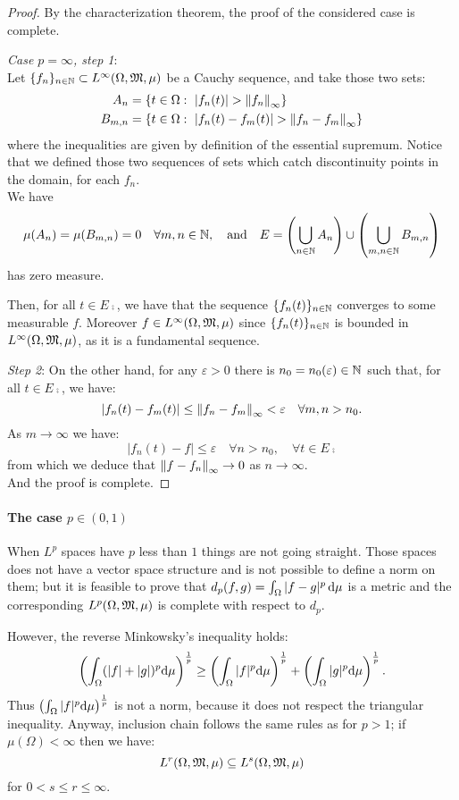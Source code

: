\begin{proof}
	By the characterization theorem, the proof of the considered case is complete.
	
	\textit{Case $p = \infty$, step 1}:\\
	Let $\{f_n\}_{n\in\mathbb N}\subset L^\infty(\Omega,\mathfrak M,\mu)$ be a Cauchy sequence, and take those two sets:
	\begin{align*}
		A_n 
		&= \{
			t\in \Omega : 
			\ |f_n(t)|>\norm{f_n}_\infty
		\} \\
		B_{m,n} 
		&= \{
			t\in \Omega : 
			\ |f_n(t)-f_m(t)|>\norm{f_n-f_m}_\infty
		\}
	\end{align*}
	where the inequalities are given by definition of the essential supremum. Notice that we defined those two sequences of sets which catch discontinuity points in the domain, for each $f_n$.\\
	We have
	$$
		\mu(A_n) 
		= \mu(B_{m,n})
		= 0
		\quad \forall m,n 
		\in \mathbb N
	, 
		\quad \text{and}
		\quad E 
		= \left(\bigcup_{n \in \mathbb N} A_n \right)
		\cup \left(\bigcup_{m,n\in \mathbb N}B_{m,n}\right)
	$$
	has zero measure.
	
	Then, for all $t \in E\comp$, we have that the sequence $\{f_n(t)\}_{n\in\mathbb N}$ converges to some measurable $f$. Moreover $f \in L^\infty(\Omega,\mathfrak M,\mu)$ since $\{f_n(t)\}_{n\in\mathbb N}$ is bounded in $L^\infty(\Omega,\mathfrak M,\mu)$, as it is a fundamental sequence.
	
	\textit{Step 2}: On the other hand, for any $\varepsilon > 0$ there is $n_0 = n_0(\varepsilon) \in \mathbb N$ such that, for all $t \in E\comp$, we have:
	$$
		| f_n(t) - f_m(t) | 
		\leq \left\lVert f_n - f_m\right\rVert_\infty < \varepsilon 
		\quad \forall m,n > n_0
	.
	$$
	As $m \to \infty$ we have:
	$$
		|f_n(t)-f|  
		\leq \varepsilon 
		\quad \forall n > n_0, 
		\quad \forall t \in E\comp
	$$
	from which we deduce that $\left\lVert f-f_n\right\rVert_\infty \to 0$ as $n \to \infty$.\\
	And the proof is complete.
\end{proof}


\paragraph{The case $p \in (0,1)$} When $L^p$ spaces have $p$ less than $1$ things are not going straight. Those spaces does not have a vector space structure and is not possible to define a norm on them; but it is feasible to prove that $d_p(f,g)= \int_\Omega|f-g|^p \,\mathrm d \mu$ is a metric and the corresponding $L^p(\Omega,\mathfrak M,\mu)$ is complete with respect to $d_p$.

However, the reverse Minkowsky's inequality holds:
$$
	\left(\int_\Omega(|f|+|g|)^p\mathrm d \mu \right)^{\frac 1 p}
	\ge \left(\int_\Omega|f|^p\mathrm d \mu\right)^{\frac 1 p}+\left(\int_\Omega|g|^p\mathrm d \mu\right)^{\frac 1 p}
.
$$
Thus $\left(\int_\Omega |f|^p \mathrm d \mu\right)^{\frac 1 p }$ is not a norm, because it does not respect the triangular inequality.
Anyway, inclusion chain follows the same rules as for $p>1$; if $\mu(\Omega)< \infty$ then we have:
$$
	L^r(\Omega, \mathfrak M, \mu) 
	\subseteq L^s(\Omega, \mathfrak M, \mu)
$$
for $0 < s \leq r \leq \infty$.